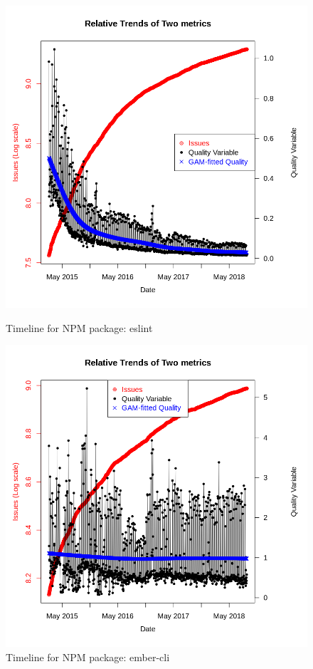 \documentclass[smallcondensed]{svjour3}     %
\begin{document}
\begin{figure}[!t]
\begin{minipage}{.45\textwidth}
\centering
\includegraphics[width=\linewidth]{eslint}
\caption{Timeline  for NPM package: eslint}
\label{fig:tNe}
\end{minipage}
\hfill
\begin{minipage}{.45\textwidth}
\centering
\includegraphics[width=\linewidth]{ember-cli}
\caption{Timeline  for NPM package: ember-cli}
\label{fig:tNel}
\end{minipage}
\vspace{-10pt}
\end{figure}
\end{document}
